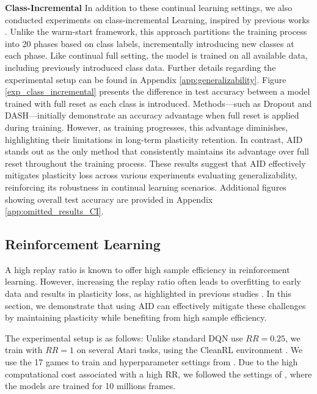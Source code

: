 \textbf{Class-Incremental} \quad
In addition to these continual learning settings, we also conducted experiments on class-incremental Learning, inspired by previous works \cite{lewandowski2024plastic, dohare2024loss}.
Unlike the warm-start framework, this approach partitions the training process into 20 phases based on class labels, incrementally introducing new classes at each phase.
Like continual full setting, the model is trained on all available data, including previously introduced class data.
Further details regarding the experimental setup can be found in Appendix \ref{app:generalizability}.
Figure \ref{exp_class_incremental} presents the difference in test accuracy between a model trained with full reset as each class is introduced.
Methods—such as Dropout and DASH—initially demonstrate an accuracy advantage when full reset is applied during training.
However, as training progresses, this advantage diminishes, highlighting their limitations in long-term plasticity retention.
In contrast, AID stands out as the only method that consistently maintains its advantage over full reset throughout the training process.
These results suggest that AID effectively mitigates plasticity loss across various experiments evaluating generalizability, reinforcing its robustness in continual learning scenarios. Additional figures showing overall test accuracy are provided in Appendix \ref{app:omitted_results_CI}.


\subsection{Reinforcement Learning}
\label{sec:exp_RL}
A high replay ratio is known to offer high sample efficiency in reinforcement learning.
However, increasing the replay ratio often leads to overfitting to early data and results in plasticity loss, as highlighted in previous studies \cite{kumar2020implicit, nikishin2022primacy}.
In this section, we demonstrate that using AID can effectively mitigate these challenges by maintaining plasticity while benefiting from high sample efficiency.

The experimental setup is as follows: 
Unlike standard DQN \cite{mnih2015human} use $RR=0.25$, we train with $RR=1$ on several Atari \cite{bellemare2013arcade} tasks, using the CleanRL environment \cite{huang2022cleanrl}.
We use the 17 games to train and hyperparameter settings from \citet{sokar2023dormant}.
Due to the high computational cost associated with a high RR, we followed the settings of \citet{sokar2023dormant, elsayed2024weight}, where the models are trained for 10 millions frames.

